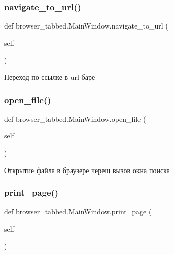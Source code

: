 \subsubsection{\texorpdfstring{navigate\_to\_url()}{navigate\_to\_url()}}
{\footnotesize\ttfamily def browser\+\_\+tabbed.\+Main\+Window.\+navigate\+\_\+to\+\_\+url (\begin{DoxyParamCaption}\item[{}]{self }\end{DoxyParamCaption})}

\begin{DoxyVerb}Переход по ссылке в url баре\end{DoxyVerb}
 \mbox{\label{classbrowser__tabbed_1_1MainWindow_a9c7888540a8fd88cf270f5d05e9887f8}} 
\subsubsection{\texorpdfstring{open\_file()}{open\_file()}}
{\footnotesize\ttfamily def browser\+\_\+tabbed.\+Main\+Window.\+open\+\_\+file (\begin{DoxyParamCaption}\item[{}]{self }\end{DoxyParamCaption})}

\begin{DoxyVerb}Открытие файла в браузере черещ вызов окна поиска\end{DoxyVerb}
 \mbox{\label{classbrowser__tabbed_1_1MainWindow_a89e86259d16b00e345c289b8e4c14bd2}} 
\subsubsection{\texorpdfstring{print\_page()}{print\_page()}}
{\footnotesize\ttfamily def browser\+\_\+tabbed.\+Main\+Window.\+print\+\_\+page (\begin{DoxyParamCaption}\item[{}]{self }\end{DoxyParamCaption})}

